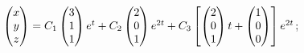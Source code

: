 \begin{enumsolsfull}
		\item \( \begin{pmatrix} x \\ y \\ z \end{pmatrix} = C_1 \begin{pmatrix} 3 \\ 1 \\ 1 \end{pmatrix} e^{t} + C_2 \begin{pmatrix} 2 \\ 0 \\ 1 \end{pmatrix} e^{2t} + C_3 \left[ \begin{pmatrix} 2 \\ 0 \\ 1 \end{pmatrix} t + \begin{pmatrix} 1 \\ 0 \\ 0 \end{pmatrix} \right] e^{2t} \); %

\end{enumsolsfull}
